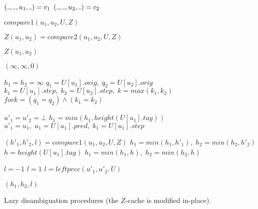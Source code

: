 \documentclass[AMA,STIX1COL]{WileyNJD-v2}
\newcommand{\Xund}{\rule{.4em}{.4pt}}
\begin{document}
\begin{algorithm}[H] \DontPrintSemicolon {} 
\begin{multicols}{2}

     {
        $(\Xund, \Xund, u_1, \Xund) = c_1$ \;
        $(\Xund, \Xund, u_2, \Xund) = c_2$ \;

        \BlankLine
        \Return $compare1 (u_1, u_2, U, Z)$ \;
    }
    \BlankLine
    \BlankLine

     {
         {
            $Z(u_1, u_2) = compare2 (u_1, u_2, U, Z)$ \;
        }

        \BlankLine
        \Return $Z(u_1, u_2)$ \;
    }
    \BlankLine
    \BlankLine

    \vfill
    \columnbreak

     {
         {
            \Return $(\infty, \infty, 0)$
        }

        \BlankLine
        $h_1 = h_2 = \infty$ \;
        $q_1 = U[u_1].orig, \; q_2 = U[u_2].orig$ \;
        $k_1 = U[u_1].step, \; k_2 = U[u_2].step, \; k = max (k_1, k_2)$ \;
        $f\!ork = (q_1 = q_2) \wedge (k_1 = k_2)$ \;

        \BlankLine
        $u'_1 = u'_2 = \bot$ \;
         {
             {
                $h_1 = min(h_1, height(U[u_1].tag))$ \;
                $u'_1 = u_1, \; u_1 = U[u_1].pred, \; k_1 = U[u_1].step$ \;
            }
        }

        \BlankLine
         {
            $(h'_1, h'_2, l) = compare1(u_1, u_2, U, Z)$ \;
            $h_1 = min(h_1, h'_1), \; h_2 = min(h_2, h'_2)$ \;
        }
         {
            $h = height(U[u_1].tag)$ \;
            $h_1 = min(h_1, h), \; h_2 = min(h_2, h)$ \;
        }

        \BlankLine
         {$l = -1$}
         {$l = 1$ }
            {$l = le\!f\!tprec(u'_1, u'_2, U)$}

        \BlankLine
        \Return $(h_1, h_2, l)$ \;
    }
    \BlankLine
    \BlankLine

\end{multicols}
\vspace{1em}
\caption{Lazy disambiguation procedures (the $Z$-cache is modified in-place).}
\end{algorithm}
\medskip
\end{document}
